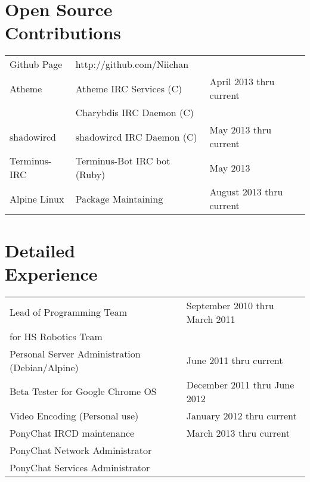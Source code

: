\documentclass[line, margin]{res}
\begin{document}
\address{12924 SE 26th ST \\ Bellevue WA, 98005 \\ +1 (425) 221-7761}
     
\begin{resume}

\section{Open Source \\ Contributions}
\begin{tabular}{l l l}
 Github Page & \hfill http://github.com/Niichan & \\ [5pt]
 Atheme & \hfill Atheme IRC Services (C) & April 2013 thru current \\ 
 & \hfill Charybdis IRC Daemon (C) \\ [5pt]
 shadowircd & \hfill shadowircd IRC Daemon (C) & May 2013 thru current \\ [5pt]
 Terminus-IRC & \hfill Terminus-Bot IRC bot (Ruby) & May 2013 \\ [5pt]
 Alpine Linux & \hfill Package Maintaining & August 2013 thru current \\
\end{tabular}

\section{Detailed \\ Experience}
\begin{tabular}{l l}
 Lead of Programming Team & \hfill September 2010 thru March 2011 \\ 
 for HS Robotics Team & \\ [6pt]
 Personal Server Administration (Debian/Alpine) & \hfill June 2011 thru current  \\ [6pt]
 Beta Tester for Google Chrome OS & \hfill December 2011 thru June 2012 \\ [6pt]
 Video Encoding (Personal use) & January 2012 thru current \\ [6pt]
 PonyChat IRCD maintenance & \hfill March 2013 thru current \\ 
 PonyChat Network Administrator & \hfill \\ 
 PonyChat Services Administrator & \hfill \\ [6pt]
\end{tabular}
   

\end{resume}
\end{document}
